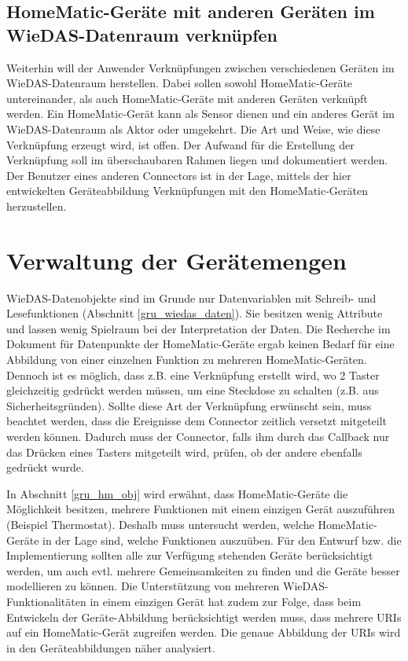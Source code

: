 \subsection{HomeMatic-Geräte mit anderen Geräten im WieDAS-Datenraum verknüpfen}
\label{uc3}
Weiterhin will der Anwender Verknüpfungen zwischen verschiedenen Geräten im WieDAS-Datenraum herstellen.
Dabei sollen sowohl HomeMatic-Geräte untereinander, als auch HomeMatic-Geräte mit anderen Geräten
verknüpft werden.
Ein HomeMatic-Gerät kann als Sensor dienen und ein anderes Gerät im WieDAS-Datenraum als Aktor oder umgekehrt.
Die Art und Weise, wie diese Verknüpfung erzeugt wird, ist offen.
Der Aufwand für die Erstellung der Verknüpfung soll im überschaubaren Rahmen liegen und
dokumentiert werden.
Der Benutzer eines anderen Connectors ist in der Lage, mittels der hier entwickelten Geräteabbildung
Verknüpfungen mit den HomeMatic-Geräten herzustellen.

\section{Verwaltung der Gerätemengen}
\label{ana_gemenge}
WieDAS-Datenobjekte sind im Grunde nur Datenvariablen mit Schreib- und Lesefunktionen (Abschnitt \ref{gru_wiedas_daten}).
Sie besitzen wenig Attribute und lassen wenig Spielraum bei der Interpretation der Daten.
Die Recherche im Dokument für Datenpunkte der HomeMatic-Geräte \cite{hmscript4} ergab keinen
Bedarf für eine Abbildung von einer einzelnen Funktion zu mehreren HomeMatic-Geräten.
Dennoch ist es möglich, dass z.B. eine Verknüpfung erstellt wird, wo 2 Taster gleichzeitig
gedrückt werden müssen, um eine Steckdose zu schalten (z.B. aus Sicherheitsgründen).
Sollte diese Art der Verknüpfung erwünscht sein, muss beachtet werden, dass die Ereignisse
dem Connector zeitlich versetzt mitgeteilt werden können.
Dadurch muss der Connector, falls ihm durch das Callback nur das Drücken eines Tasters
mitgeteilt wird, prüfen, ob der andere ebenfalls gedrückt wurde.

In Abschnitt \ref{gru_hm_obj} wird erwähnt, dass HomeMatic-Geräte die Möglichkeit besitzen,
mehrere Funktionen mit einem einzigen Gerät auszuführen (Beispiel Thermostat).
Deshalb muss untersucht werden, welche HomeMatic-Geräte in der Lage sind, welche Funktionen
auszuüben.
Für den Entwurf bzw. die Implementierung sollten alle zur Verfügung stehenden Geräte
berücksichtigt werden, um auch evtl. mehrere Gemeinsamkeiten zu finden und die Geräte
besser modellieren zu können.
Die Unterstützung von mehreren WieDAS-Funktionalitäten in einem einzigen Gerät hat zudem
zur Folge, dass beim Entwickeln der Geräte-Abbildung berücksichtigt werden muss, dass mehrere
URIs auf ein HomeMatic-Gerät zugreifen werden.
Die genaue Abbildung der URIs wird in den Geräteabbildungen näher analysiert.

